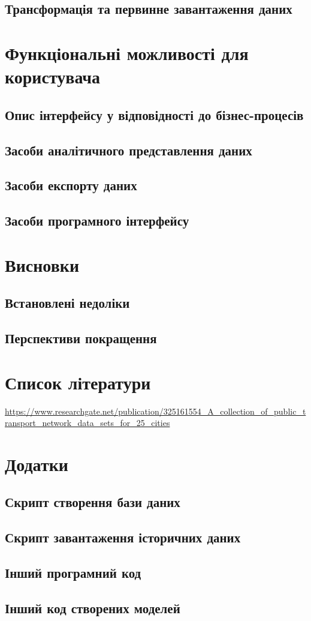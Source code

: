 \documentclass[oneside,14pt]{extarticle}
\begin{document}
\subsection{Трансформація та первинне завантаження даних}
\newpage

\section{Функціональні можливості для користувача}
\subsection{Опис інтерфейсу у відповідності до бізнес-процесів}
\subsection{Засоби аналітичного представлення даних}
\subsection{Засоби експорту даних}
\subsection{Засоби програмного інтерфейсу}
\newpage

\section{Висновки}
\subsection{Встановлені недоліки}
\subsection{Перспективи покращення}
\newpage

\section{Список літератури}
\url{https://www.researchgate.net/publication/325161554_A_collection_of_public_transport_network_data_sets_for_25_cities}
\newpage

\section{Додатки}
\subsection{Скрипт створення бази даних}
\subsection{Скрипт завантаження історичних даних}
\subsection{Інший програмний код}
\subsection{Інший код створених моделей}
\newpage
\end{document}
